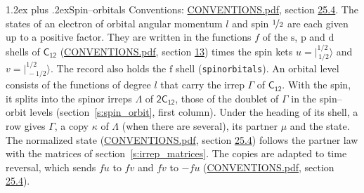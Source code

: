 \documentclass[10pt,a4paper]{article}
\makeatletter
\renewcommand\section{\@startsection{section}{1}{\z@}{-3ex plus -1ex minus -.2ex}%
  {1.2ex plus .2ex}{\normalfont\large\sffamily\bfseries\color{parttitle}}}
\numberwithin{equation}{section}
\newcommand{\grp}[1]{\mathsf{#1}}
\newcommand{\orbital}[1]{\mathrm{#1}}
\newcommand{\mult}{\kappa}
\newcommand{\intx}{\mu}
\newcommand{\jm}[2]{\bigl\lvert{}^{#1}_{\,#2}\bigr\rangle}
\makeatother
\begin{document}
\section{Spin--orbitals}\label{s:spin_orbitals}
Conventions: \href{../../CONVENTIONS.pdf}{CONVENTIONS.pdf}, section \href{../../CONVENTIONS.pdf\#conv.25.4}{25.4}.
\leavevmode\label{n:index.orbital.l}The states of an electron of orbital angular momentum $l$ and spin $\nicefrac{1}{2}$ are each given up to a positive factor. \label{n:local.spinor.uv}\label{n:local.function.f}They are written in the functions $f$ of the $\orbital{s}$, $\orbital{p}$ and $\orbital{d}$ shells of \href{../../../rotation/data/pdf/C12.pdf}{$\grp{C_{12}}$} (\href{../../CONVENTIONS.pdf}{CONVENTIONS.pdf}, section \href{../../../rotation/CONVENTIONS.pdf\#conv.13}{13}) times the spin kets $u = \jm{1/2}{1/2}$ and $v = \jm{1/2}{-1/2}$. The record also holds the $\orbital{f}$ shell (\texttt{spinorbitals}). An orbital level consists of the functions of degree $l$ that carry the irrep $\Gamma$ of \href{../../../rotation/data/pdf/C12.pdf}{$\grp{C_{12}}$}. With the spin, it splits into the spinor irreps $\Lambda$ of $\grp{2C_{12}}$, those of the doublet of $\Gamma$ in the spin--orbit levels (section~\ref{s:spin_orbit}, first column). \label{n:head.state}Under the heading of its shell, a row gives $\Gamma$, a copy $\mult$ of $\Lambda$ (when there are several), its partner $\intx$ and the state. The normalized state (\href{../../CONVENTIONS.pdf}{CONVENTIONS.pdf}, section \href{../../CONVENTIONS.pdf\#conv.25.4}{25.4}) follows the partner law with the matrices of section~\ref{s:irrep_matrices}. The copies are adapted to time reversal, which sends $f u$ to $f v$ and $f v$ to $-f u$ (\href{../../CONVENTIONS.pdf}{CONVENTIONS.pdf}, section \href{../../CONVENTIONS.pdf\#conv.25.4}{25.4}).
\end{document}
